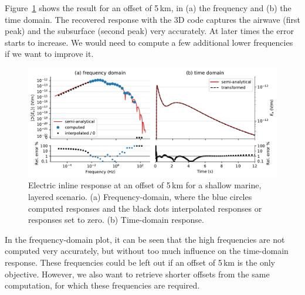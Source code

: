 \documentclass[extra, camera,%
    final,       %
]{gji}
\newlength{\fwidth}
\begin{document}
Figure~\ref{fig:marine} shows the result for an offset of 5\,km, in (a) the
frequency and (b) the time domain. The recovered response with the 3D code
captures the airwave (first peak) and the subsurface (second peak) very
accurately. At later times the error starts to increase. We would need to
compute a few additional lower frequencies if we want to improve it.
%
\begin{figure}
  \centering
  \includegraphics[width=\fwidth]{06-marine}
  \caption{Electric inline response at an offset of 5\,km for a shallow marine,
  layered scenario. (a) Frequency-domain, where the blue
  circles  computed responses and the black dots
   interpolated responses or responses set to zero. (b)
  Time-domain response.}
  \label{fig:marine}
\end{figure}
%
In the frequency-domain plot, it can be seen that the high frequencies are not
computed very accurately, but without too much influence on the time-domain
response. These frequencies could be left out if an offset of 5\,km is the only
objective. However, we also want to retrieve shorter offsets from the same
computation, for which these frequencies are required.
\end{document}
